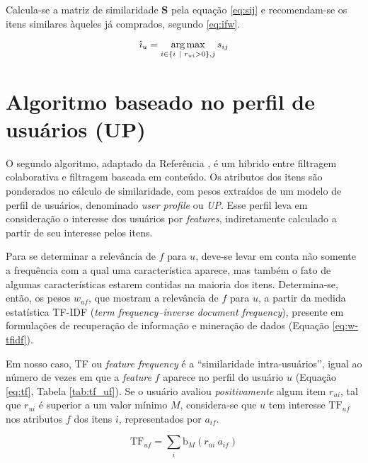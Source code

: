 Calcula-se a matriz de similaridade $\mathbf{S}$ pela equação \ref{eq:sij} e recomendam-se os itens similares àqueles já comprados, segundo \ref{eq:ifw}.

\begin{equation}
\label{eq:ifw} 
    \hat{\imath}_u = \operatorname*{arg\,max}_{i \in \left\{i~|~r_{ui} > 0\right\}, j}{s_{ij}}
\end{equation} 



\section{Algoritmo baseado no perfil de usuários (UP)} %
\label{sec:algoritmo_baseado_no_perfil_de_usu_rios_}


O segundo algoritmo, adaptado da Referência , é um hibrido entre filtragem colaborativa e filtragem baseada em conteúdo. Os atributos dos itens são ponderados no cálculo de similaridade, com pesos extraídos de um modelo de perfil de usuários, denominado \textit{user profile} ou \textit{UP}. Esse perfil leva em consideração o interesse dos usuários por \textit{features}, indiretamente calculado a partir de seu interesse pelos itens. 

Para se determinar a relevância de $f$ para $u$, deve-se levar em conta não somente a frequência com a qual uma característica aparece, mas também o fato de algumas características estarem contidas na maioria dos itens. Determina-se, então, os pesos $w_{uf}$, que mostram a relevância de $f$ para $u$, a partir da medida estatística TF-IDF (\textit{term frequency--inverse document frequency}), presente em formulações de recuperação de informação e mineração de dados (Equação \ref{eq:w-tfidf}). 

Em nosso caso, TF ou \textit{feature frequency} é a ``similaridade intra-usuários'', igual ao número de vezes em que a \textit{feature} $f$ aparece no perfil do usuário $u$ (Equação \ref{eq:tf}, Tabela \ref{tab:tf_uf}). Se o usuário avaliou \textit{positivamente} algum item $r_{ui}$, tal que $r_{ui}$ é superior a um valor mínimo $M$, considera-se que $u$ tem interesse $\mathrm{TF}_{uf}$ nos atributos $f$ dos itens $i$, representados por $a_{if}$. 

\begin{equation}
\label{eq:tf} 
    \mathrm{TF}_{uf}  = \sum_{i}{\mathrm{b}_M\left(r_{ui}~a_{if}\right)} 
\end{equation} 

